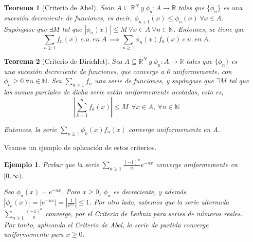 \documentclass[11pt, a4paper]{article}
\newif\IfInSansMode
\theoremstyle{theorem-style}
\newtheorem{nth}{Teorema}[section]
\theoremstyle{definition-style}
\theoremstyle{remark-style}
\theoremstyle{example-style}
\newtheorem{ejemplo}{Ejemplo}[section]
\begin{document}
\begin{nth}[Criterio de Abel] \label{11} Sean $ A \subseteq \mathbb{R}^N\  y \ \phi_n : A \rightarrow \mathbb{R}$ tales que $\{\phi_n\}$ es una sucesión decreciente de funciones, es decir, $\phi_{n+1}(x) \leq \phi_n (x)\ \forall x \in A.$ Supóngase que $\exists M$ tal que $|\phi_n (x)| \leq M\ \forall x \in A\ \forall n \in \mathbb{N}.$ Entonces, se tiene que
  $$\sum_{n \ge 1} f_n(x)\ c. u.\ en\ A\, \implies \sum_{n \ge 1} \phi_n(x) f_n(x)\ c. u.\ en\ A.$$
\end{nth}

\begin{nth}[Criterio de Dirichlet] \label{12} Sea $A \subseteq \mathbb{R}^N\  y \ \phi_n : A \rightarrow \mathbb{R}$ tales que $\{\phi_n\}$ es una sucesión decreciente de funciones, que converge a 0 uniformemente, con $\phi_n \ge 0 \ \forall n \in \mathbb{N}$. Sea $\sum_{n \ge 1} f_n$ una serie de funciones, y supóngase que $\exists M$ tal que las sumas parciales de dicha serie están uniformemente acotadas, esto es, $$\left| \sum_{k=1}^n f_k(x) \right| \le M \ \ \forall x \in A, \ \forall n \in \mathbb{N}$$ 

  Entonces, la serie $\displaystyle \sum_{n\ge 1} \phi_n(x)f_n(x)$ converge uniformemente en $A$.
  
\end{nth}


Veamos un ejemplo de aplicación de estos criterios.

\begin{ejemplo}
  Probar que la serie $\displaystyle \sum_{n \ge 1} \frac{(-1)^n}{n} e^{-nx}$ converge uniformemente en $[0, \infty)$.
  
  Sea $\phi_n(x) = e^{-nx}$. Para $x \ge 0$, $\phi_n$ es decreciente, y además $|\phi_n(x)| = | e^{-nx} |  = |\frac{1}{e^{nx}} |\le 1$. Por otro lado, sabemos que la serie alternada $ \sum_{n \ge 1} \frac{(-1)^n}{n}$ converge, por el \textit{Criterio de Leibniz} para series de números reales. Por tanto, aplicando el \textit{Criterio de Abel}, la serie de partida converge uniformemente para $x \ge 0$.  
\end{ejemplo}


\end{document}
